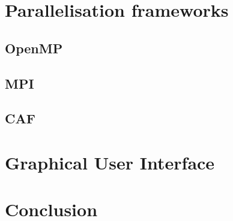 \documentclass[12pt]{article}
\begin{document}
\newpage
\section{Parallelisation frameworks}		\label{sec:paralframew}
	\subsection{OpenMP}			\label{sec:openmp}			
	\subsection{MPI}			\label{sec:mpi}				
	\subsection{CAF}			\label{sec:caf}				

\newpage
\section{Graphical User Interface}		\label{sec:gui}				

\newpage
	\section{Conclusion}			\label{sec:conclusion}			
\newpage



\end{document}
